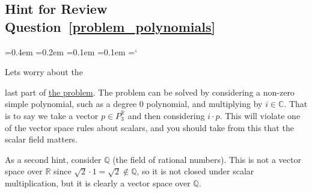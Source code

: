 
\subsection*{Hint for Review Question~\ref{problem_polynomials}}

{\ttfamily
{}\font=0.4em
\font=0.2em
\font=0.1em
\font=0.1em
\hyphenchar\font=`\-

\hypertarget{scripts_vector_spaces_hint}{Lets worry about the} last part of \hyperref[problem_polynomials]{the problem}. The problem can be solved by considering a non-zero simple polynomial, such as a degree 0 polynomial, and multiplying by $i \in \mathbb{C}$. That is to say we take a vector $p \in P_3^{\mathbb{R}}$ and then considering $i \cdot p$. This will violate one of the vector space rules about scalars, and you should take from this that the scalar field matters.

As a second hint, consider $\mathbb{Q}$ (the field of rational numbers). This is not a vector space over $\mathbb{R}$ since $\sqrt{2} \cdot 1 = \sqrt{2} \notin \mathbb{Q}$, so it is not closed under scalar multiplication, but it is clearly a vector space over $\mathbb{Q}$.

} %

